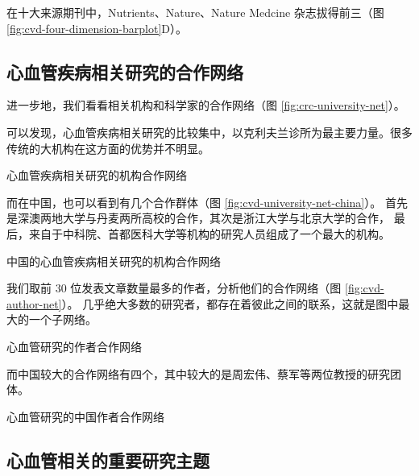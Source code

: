 \documentclass[]{ctexbook}
\begin{document}
在十大来源期刊中，Nutrients、Nature、Nature Medcine 杂志拔得前三（图 \ref{fig:cvd-four-dimension-barplot}D）。

\hypertarget{ux5fc3ux8840ux7ba1ux75beux75c5ux76f8ux5173ux7814ux7a76ux7684ux5408ux4f5cux7f51ux7edc}{%
\subsection{心血管疾病相关研究的合作网络}\label{ux5fc3ux8840ux7ba1ux75beux75c5ux76f8ux5173ux7814ux7a76ux7684ux5408ux4f5cux7f51ux7edc}}

进一步地，我们看看相关机构和科学家的合作网络（图 \ref{fig:crc-university-net}）。

可以发现，心血管疾病相关研究的比较集中，以克利夫兰诊所为最主要力量。很多传统的大机构在这方面的优势并不明显。

\hypertarget{htmlwidget-b5dce286375cb41a60a0}{}

\label{fig:cvd-university-net}心血管疾病相关研究的机构合作网络

而在中国，也可以看到有几个合作群体（图 \ref{fig:cvd-university-net-china}）。
首先是深澳两地大学与丹麦两所高校的合作，其次是浙江大学与北京大学的合作，
最后，来自于中科院、首都医科大学等机构的研究人员组成了一个最大的机构。

\hypertarget{htmlwidget-9a9926f744f739e544ea}{}

\label{fig:cvd-university-net-china}中国的心血管疾病相关研究的机构合作网络

我们取前 30 位发表文章数量最多的作者，分析他们的合作网络（图 \ref{fig:cvd-author-net}）。
几乎绝大多数的研究者，都存在着彼此之间的联系，这就是图中最大的一个子网络。

\hypertarget{htmlwidget-da28823b9c96e068d80d}{}

\label{fig:cvd-author-net}心血管研究的作者合作网络

而中国较大的合作网络有四个，其中较大的是周宏伟、蔡军等两位教授的研究团体。

\hypertarget{htmlwidget-cd17828ebd27a87a30a2}{}

\label{fig:cvd-author-net-china}心血管研究的中国作者合作网络

\hypertarget{ux5fc3ux8840ux7ba1ux76f8ux5173ux7684ux91cdux8981ux7814ux7a76ux4e3bux9898}{%
\subsection{心血管相关的重要研究主题}\label{ux5fc3ux8840ux7ba1ux76f8ux5173ux7684ux91cdux8981ux7814ux7a76ux4e3bux9898}}
\end{document}
